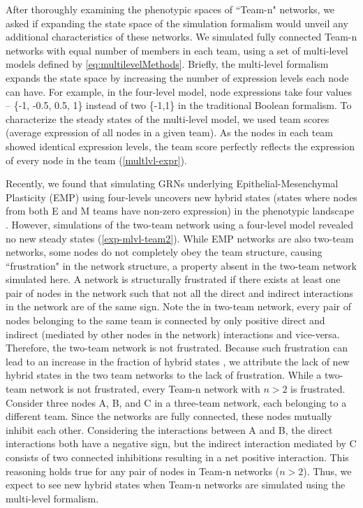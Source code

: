 \documentclass[11pt,a4paper]{article}
\theoremstyle{definition}
\theoremstyle{remark}
\begin{document}
After thoroughly examining the phenotypic spaces of ``Team-n" networks, we asked if expanding the state space of the simulation formalism would unveil any additional characteristics of these networks. We simulated fully connected Team-n networks with equal number of members in each team, using a set of multi-level models defined by \cref{eq:multilevelMethods}. Briefly, the multi-level formalism expands the state space by increasing the number of expression levels each node can have. For example, in the four-level model, node expressions take four values – \{-1, -0.5, 0.5, 1\} instead of two \{-1,1\} in the traditional Boolean formalism. To characterize the steady states of the multi-level model, we used team scores (average expression of all nodes in a given team). As the nodes in each team showed identical expression levels, the team score perfectly reflects the expression of every node in the team (\cref{multlvl-expr}). 

Recently, we found that simulating GRNs underlying Epithelial-Mesenchymal Plasticity (EMP) using four-levels uncovers new hybrid states (states where nodes from both E and M teams have non-zero expression) in the phenotypic landscape \parencite{hari_multi-level_2024}. However, simulations of the two-team network using a four-level model revealed no new steady states (\cref{exp-mlvl-team2}). While EMP networks are also two-team networks, some nodes do not completely obey the team structure, causing ``frustration" in the network structure, a property absent in the two-team network simulated here. A network is structurally frustrated if there exists at least one pair of nodes in the network such that not all the direct and indirect interactions in the network are of the same sign. Note the in two-team network, every pair of nodes belonging to the same team is connected by only positive direct and indirect (mediated by other nodes in the network) interactions and vice-versa. Therefore, the two-team network is not frustrated. Because such frustration can lead to an increase in the fraction of hybrid states \parencite{tripathi_biological_2020, rashid_network_2022},  we attribute the lack of new hybrid states in the two team networks to the lack of frustration. While a two-team network is not frustrated, every Team-n network with $n>2$ is frustrated. Consider three nodes A, B, and C in a three-team network, each belonging to a different team. Since the networks are fully connected, these nodes mutually inhibit each other. Considering the interactions between A and B, the direct interactions both have a negative sign, but the indirect interaction mediated by C consists of two connected inhibitions resulting in a net positive interaction. This reasoning holds true for any pair of nodes in Team-n networks ($n>2$). Thus, we expect to see new hybrid states when Team-n networks are simulated using the multi-level formalism.
\end{document}
